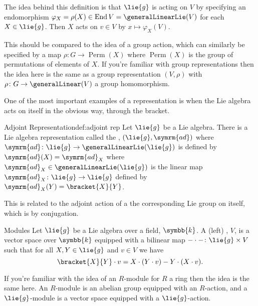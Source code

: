 \documentclass[fleqn]{NotesClass}
\renewcommand{\field}{\symbb{k}}
\DeclareMathOperator{\End}{End}
\newcommand{\ad}{\symrm{ad}}
\DeclareMathOperator{\Perm}{Perm}
\begin{document}
    The idea behind this definition is that \(\lie{g}\) is acting on \(V\) by specifying an endomorphism \(\varphi_X = \rho(X) \in \End V = \generalLinearLie(V)\) for each \(X \in \lie{g}\).
    Then \(X\) acts on \(v \in V\) by \(x \mapsto \varphi_X(V)\).
    
    This should be compared to the idea of a group action, which can similarly be specified by a map \(\rho \colon G \to \Perm(X)\) where \(\Perm(X)\) is the group of permutations of elements of \(X\).
    If you're familiar with group representations then the idea here is the same as a group representation \((V, \rho)\) with \(\rho \colon G \to \generalLinear(V)\) a group homomorphism.
    
    One of the most important examples of a representation is when the Lie algebra acts on itself in the obvious way, through the bracket.
    
    \begin{dfn}{Adjoint Representation}{def:adjoint rep}
        Let \(\lie{g}\) be a Lie algebra.
        There is a Lie algebra representation called the , \((\lie{g}, \ad)\) where \(\ad \colon \lie{g} \to \generalLinearLie(\lie{g})\) is defined by \(\ad(X) = \ad_X\) where \(\ad_X \in \generalLinearLie(\lie{g})\) is the linear map \(\ad_X \colon \lie{g} \to \lie{g}\) defined by \(\ad_X(Y) = \bracket{X}{Y}\).
    \end{dfn}
    
    This is related to the adjoint action of a the corresponding Lie group on itself, which is by conjugation.
    
    \begin{dfn}{Modules}{}
        Let \(\lie{g}\) be a Lie algebra over a field, \(\field\).
        A (left) , \(V\), is a vector space over \(\field\) equipped with a bilinear map \({-} \cdot {-} \colon \lie{g} \times V\) such that for all \(X, Y \in \lie{g}\) and \(v \in V\) we have
        \begin{equation}
            \bracket{X}{Y} \cdot v = X \cdot (Y \cdot v) - Y \cdot (X \cdot v).
        \end{equation}
    \end{dfn}
    
    If you're familiar with the idea of an \(R\)-module for \(R\) a ring then the idea is the same here.
    An \(R\)-module is an abelian group equipped with an \(R\)-action, and a \(\lie{g}\)-module is a vector space equipped with a \(\lie{g}\)-action.
    
\end{document}
